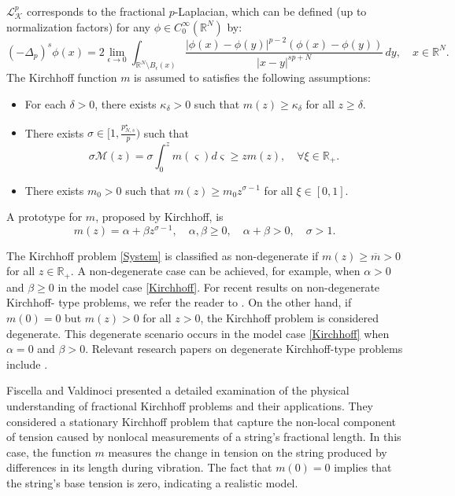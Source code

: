 \documentclass[10pt,a4paper]{amsart}
\numberwithin{equation}{section}
\begin{document}
$\mathcal{L}_\mathcal{K}^p$ corresponds to the fractional $p$-Laplacian, which can be 
defined (up to normalization factors) for any $\phi\in C^\infty_0(\mathbb{R}^N)$ by:
$$
(-\Delta_p)^s\phi(x)
=2\lim_{\epsilon\to 0}\int_{\mathbb{R}^N\setminus B_\epsilon(x)}
\frac{|\phi(x)-\phi(y)|^{p-2}(\phi(x)-\phi(y))}{|x-y|^{sp+N}}\,dy,\quad x\in\mathbb{R}^N.
$$
The Kirchhoff function $m$ is assumed to satisfies the following assumptions:
\begin{itemize}
 \item[(A1)] For each $\delta>0$, there exists $\kappa_\delta>0$ such that
 $m(z)\geq \kappa_\delta$ for all $z\geq \delta$.

\item[(A2)] There exists $\sigma\in [1,\frac{p^\star_{N,s}}{p})$ such that
 $$ 
\sigma\mathscr{M}(z)=\sigma\int_0^z m(\varsigma)d\varsigma
\geq z m(z),\quad \forall \xi\in \mathbb{R}_+.
$$

\item[(A3)] There exists $m_0>0$ such that
$m(z)\geq m_0z^{\sigma-1}$ for all $\xi\in [0,1]$.
\end{itemize} 
A prototype for $m$, proposed by Kirchhoff, is 
\begin{equation}\label{Kirchhoff}
m(z)=\alpha+\beta z^{\sigma-1},\quad \alpha,\beta \geq 0,\quad \alpha+\beta>0,
\quad \sigma>1.
\end{equation}

The Kirchhoff problem \eqref{System} is classified as non-degenerate if 
$m(z)\geq \overline{m}>0$ for all $z\in \mathbb{R}_+$.
A non-degenerate case can be achieved, for example, when $\alpha>0$ and $\beta\geq 0$
in the model case \eqref{Kirchhoff}. For recent results on non-degenerate Kirchhoff-
type problems, we refer the reader to \cite{o, Ny, Ny1, Ny2, p}. On the other hand, 
if $m(0)=0$ but $m(z)>0$ for all $z>0$, the Kirchhoff problem is considered degenerate. 
This degenerate scenario occurs in the model case  \eqref{Kirchhoff} when 
$\alpha=0$ and $\beta>0$. Relevant research papers on degenerate Kirchhoff-type problems
include \cite{Au, Col, daoua, Liu, s}.

Fiscella and Valdinoci  \cite{fisc} presented a detailed examination of the physical 
understanding of fractional Kirchhoff problems and their applications.  
They considered a stationary Kirchhoff  problem that capture the non-local component 
of tension caused by nonlocal measurements of a string's fractional length.  
In this case, the function $m$ measures the change in tension on the string produced 
by differences in its length during vibration.  
The fact that $m(0)=0$ implies that the string's base tension is zero, indicating 
a realistic model.
\end{document}
